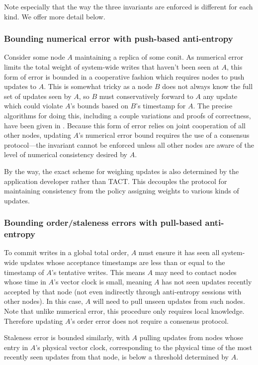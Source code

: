 Note especially that the way the three invariants are enforced is different for
each kind. We offer more detail below.


\subsubsection{Bounding numerical error with push-based anti-entropy}

Consider some node $A$ maintaining a replica of some conit. As numerical error
limits the total weight of system-wide writes that haven't been seen at $A$,
this form of error is bounded in a cooperative fashion which requires nodes to
push updates to $A$. This is somewhat tricky as a node $B$ does not always know
the full set of updates seen by $A$, so $B$ must conservatively forward to $A$
any update which could violate $A$'s bounds based on $B$'s timestamp for $A$.
The precise algorithms for doing this, including a couple variations and proofs
of correctness, have been given in \cite{2000tactalgorithms}. Because this form
of error relies on joint cooperation of all other nodes, updating $A$'s
numerical error bound requires the use of a consensus protocol---the invariant
cannot be enforced unless all other nodes are aware of the level of numerical
consistency desired by $A$.

By the way, the exact scheme for weighing updates is also determined by the
application developer rather than TACT. This decouples the protocol for
maintaining consistency from the policy assigning weights to various kinds of
updates.

\subsubsection{Bounding order/staleness errors with pull-based anti-entropy}

To commit writes in a global total order, $A$ must ensure it has seen all
system-wide updates whose acceptance timestamps are less than or equal to the
timestamp of $A$'s tentative writes. This means $A$ may need to contact nodes
whose time in $A$'s vector clock is small, meaning $A$ has not seen updates
recently accepted by that node (not even indirectly through anti-entropy
sessions with other nodes). In this case, $A$ will need to pull unseen updates
from such nodes. Note that unlike numerical error, this procedure only requires
local knowledge. Therefore updating $A$'s order error does not require a
consensus protocol.

Staleness error is bounded similarly, with $A$ pulling updates from nodes whose
entry in $A$'s physical vector clock, corresponding to the physical time of the
most recently seen updates from that node, is below a threshold determined by
$A$.

